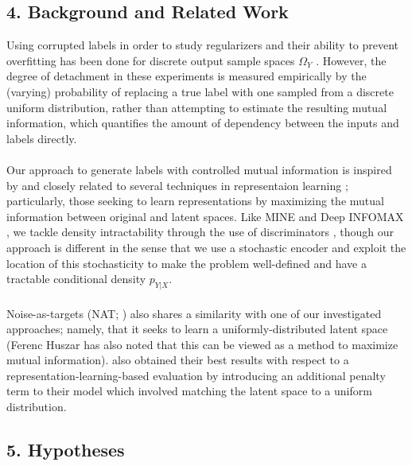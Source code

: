 \documentclass{NSF}
\begin{document}
\subsection{4. Background and Related Work}

Using corrupted labels in order to study regularizers and their ability to prevent overfitting has been done for discrete output sample spaces $\Omega_Y$ \citep{zhang2016understanding}. However, the degree of detachment in these experiments is measured empirically by the (varying) probability of replacing a true label with one sampled from a discrete uniform distribution, rather than attempting to estimate the resulting mutual information, which quantifies the amount of dependency between the inputs and labels directly.
\\
\\
Our approach to generate labels with controlled mutual information is inspired by and closely related to several techniques in representaion learning
\citep{bengio2013representation}; particularly, those seeking to learn representations
by maximizing the mutual information between original and latent spaces. Like MINE
\citep{belghazi2018mine} and Deep INFOMAX \citep{hjelm2018learning}, we tackle density
intractability through the use of discriminators \citep{goodfellow2014generative},
though our approach is different in the sense that we use a stochastic encoder and
exploit the location of this stochasticity to make the problem well-defined and have a
tractable conditional density $p_{Y|X}$.
\\
\\
Noise-as-targets (NAT; \cite{bojanowski2017unsupervised}) also shares a similarity with
one of our investigated approaches; namely, that it seeks to learn a
uniformly-distributed latent space (Ferenc Huszar has also noted that this can be viewed
as a method to maximize mutual information). \cite{hjelm2018learning} also obtained their best
results with respect to a representation-learning-based evaluation by introducing an
additional penalty term to their model which involved matching the latent space to a
uniform distribution.

\subsection{5. Hypotheses}
\end{document}
